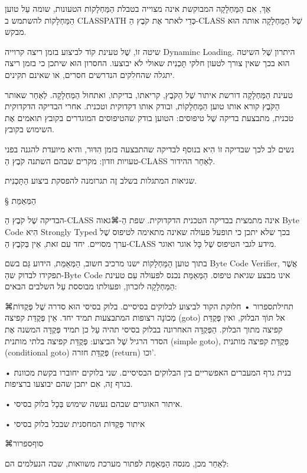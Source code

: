 אַךְ, אִם הַמַּחְלָקָה המבוקשת אינה מצוייה בטבלת הַמַּחְלָקוֹת הטעונות, שומה עַל
טוען הַמַּחְלָקוֹת להשתמש ב CLASSPATH כְּדֵי לאתר אֶת קֹבֶץ הַ-CLASS שֶׁל
הַמַּחְלָקָה אותה הוּא מבקש.

שיטה זוֹ, שֶׁל טעינת קוֹד לביצוע בזמן ריצה קרוייה Dynaminc Loading. היתרון שֶׁל
השיטה הוּא בכך שאין צורך לטעון חלקי תָּכְנִית שאולי לֹא יבוצעו. החסרון הוּא
שיתכן כי בזמן ריצה יתגלה שהחלקים הנדרשים חסרים, או שאינם תקינים.

טעינת הַמַּחְלָקָה דורשת איתור שֶׁל הַקֹּבֶץ, קריאתו, בדיקתו, ואתחול
הַמַּחְלָקָה. לְאַחַר שאותר הַקֹּבֶץ קורא אותו טוען הַמַּחְלָקוֹת, ובודק אותו
דקדוקית וטכנית. אחרי הבדיקה הדקדוקית טכנית, מתבצעת בדיקה שֶׁל טיפוסים: הטוען
בודק שהטיפוסים המוגדרים בקובץ תואמים אֶת השימוש בקובץ.

נשים לב לכך שבדיקה זוֹ הִיא בנוסף לבדיקה שהתבצעה בזמן הִדּוּר, והיא מיועדת להגנה
בפני טעויות וזדון: מקרים שבהם השתנה קֹבֶץ הַ-CLASS לְאַחַר ההידור.

שגיאות המתגלות בשלב זֶה תגרומנה להפסקת ביצוע הַתָּכְנִית.

§ הַמְּאַמֵּת

הבדיקה שֶׁל קֹבֶץ הַ-CLASS אינה מתמצית בבדיקה הטכנית הדקדוקית. שפת הַ-⌘גאוה Byte
Code הִיא Strongly Typed בכך שלא יתכן כי תופעל פעולה שאינה מתאימה לטיפוס שֶׁל
ערך מסויים. יחד עִם זאת, אֵין בְּקֹבֶץ הַ-CLASS מידע לגבי הטיפוס שֶׁל כָּל אוגר
ואוגר.

בתוך טוען הַמַּחְלָקוֹת ישנו מרכיב חשוב, הַמְּאַמֵּת, הידוע גַּם בשם Byte Code
Verifier, אֲשֶׁר תפקידו לבדוק שהַ-Byte Code אינו מבצע שגיאת טיפוס. הַמְּאַמֵּת
נכנס לפעולה עִם טעינת הַמַּחְלָקָה לזכרון, ופעולתו מבוססת עַל השלבים הבאים:

⌘תחילת{ספרור}
• חלוקת הקוד לביצוע לבלוקים בסיסיים. בלוק בסיסי הוּא סדרה שֶׁל פְּקֻדּוֹת
מְכוֹנָה רצופות המתבצעות תמיד יחד. אֵין פְּקֻדַּת קפיצה (goto) אל תּוֹךְ הבלוק,
ואין פְּקֻדַּת קפיצה מתוך הבלוק. הַפְּקֻדָּה האחרונה בבלוק בסיסי תהיה עַל כן
תמיד פְּקֻדָּה המשנה אֶת הסדר הרגיל שֶׁל הביצוע: פְּקֻדַּת קפיצה בלתי מותנית
(simple goto), פְּקֻדַּת קפיצה  מותנית (conditional goto) פְּקֻדַּת חזרה
(return) וכו'.

•  בנית גרף המעברים האפשריים בין הבלוקים הבסיסיים. שני בלוקים יחוברו בקשת מכוונת
בגרף זֶה, אִם יתכן שהם יבוצעו ברציפות.

•  איתור האוגרים שבהם נעשה שימוש בְּכָל בלוק בסיסי.

•  איתור פְּקֻדּוֹת המחסנית שבכל בלוק בסיסי

⌘סוף{ספרור}

לְאַחַר מכן, מנסה הַמְּאַמֵּת לפתור מערכת משוואות, שבה הנעלמים הם:

